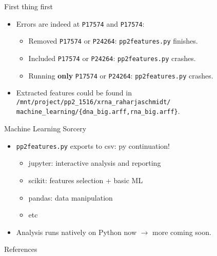 \documentclass[pdf]
{beamer}
\begin{document}
\begin{frame}{First thing first}
	\begin{itemize}
		\item Errors are indeed at \texttt{P17574} and \texttt{P17574}:
		\begin{itemize}
			\item Removed \texttt{P17574} or \texttt{P24264}: \texttt{pp2features.py} finishes.
			\item Included \texttt{P17574} or \texttt{P24264}: \texttt{pp2features.py} crashes.
			\item Running \textbf{only} \texttt{P17574} or \texttt{P24264}: \texttt{pp2features.py} crashes.
		\end{itemize}
		\item Extracted features could be found in \texttt{/mnt/project/pp2\_1516/xrna\_raharjaschmidt/} \texttt{machine\_learning/\{dna\_big.arff,rna\_big.arff\}}.
	\end{itemize}
\end{frame}

\begin{frame}{Machine Learning Sorcery}
	\begin{itemize}
		\item \texttt{pp2features.py} exports to csv: py continuation!
		\begin{itemize}
			\item jupyter: interactive analysis and reporting
			\item scikit: features selection + basic ML
			\item pandas: data manipulation
			\item etc
		\end{itemize}
		\item Analysis runs natively on Python now $\rightarrow$ more coming soon.
	\end{itemize}
\end{frame}


\begin{frame}{References}

\end{frame}
\end{document}
